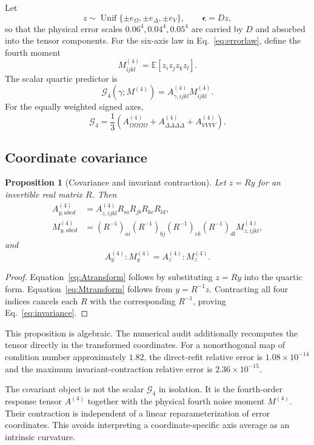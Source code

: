 \documentclass[11pt]{article}
\newtheorem{proposition}{Proposition}
\newcommand{\E}{\mathbb{E}}
\newcommand{\cG}{\mathcal{G}}
\begin{document}
Let
\[
z\sim\operatorname{Unif}\{\pm e_\Omega,\pm e_\Delta,\pm e_V\},
\qquad
\boldsymbol{\epsilon}=Dz,
\]
so that the physical error scales $0.06^{4},0.04^{4},0.05^{4}$ are carried by $D$ and absorbed into the tensor components. For the six-axis law in Eq.~\eqref{eq:errorlaw}, define the fourth moment
\[
M^{(4)}_{ijkl}
=\E[z_i z_j z_k z_l].
\]
The scalar quartic predictor is
\begin{equation}
\cG_4(\gamma;M^{(4)})
=A^{(4)}_{\gamma,ijkl}M^{(4)}_{ijkl}.
\label{eq:G4}
\end{equation}
For the equally weighted signed axes,
\[
\cG_4
=\frac{1}{3}
\left(
A^{(4)}_{\Omega\Omega\Omega\Omega}
+A^{(4)}_{\Delta\Delta\Delta\Delta}
+A^{(4)}_{VVVV}
\right).
\]

\subsection{Coordinate covariance}

\begin{proposition}[Covariance and invariant contraction]
Let $z=Ry$ for an invertible real matrix $R$. Then
\begin{align}
A^{(4)}_{y,abcd}
&=
A^{(4)}_{z,ijkl}
R_{ia}R_{jb}R_{kc}R_{ld},
\label{eq:Atransform}\\
M^{(4)}_{y,abcd}
&=
(R^{-1})_{ai}(R^{-1})_{bj}
(R^{-1})_{ck}(R^{-1})_{dl}
M^{(4)}_{z,ijkl},
\label{eq:Mtransform}
\end{align}
and
\begin{equation}
A^{(4)}_y:M^{(4)}_y
=A^{(4)}_z:M^{(4)}_z.
\label{eq:invariance}
\end{equation}
\end{proposition}

\begin{proof}
Equation~\eqref{eq:Atransform} follows by substituting $z=Ry$ into the quartic form. Equation~\eqref{eq:Mtransform} follows from $y=R^{-1}z$. Contracting all four indices cancels each $R$ with the corresponding $R^{-1}$, proving Eq.~\eqref{eq:invariance}.
\end{proof}

This proposition is algebraic. The numerical audit additionally recomputes the tensor directly in the transformed coordinates. For a nonorthogonal map of condition number approximately $1.82$, the direct-refit relative error is $1.08\times10^{-14}$ and the maximum invariant-contraction relative error is $2.36\times10^{-15}$.

The covariant object is not the scalar $\cG_4$ in isolation. It is the fourth-order response tensor $A^{(4)}$ together with the physical fourth noise moment $M^{(4)}$. Their contraction is independent of a linear reparameterization of error coordinates. This avoids interpreting a coordinate-specific axis average as an intrinsic curvature.
\end{document}
